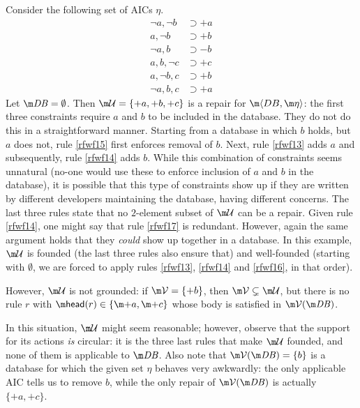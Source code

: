 \begin{example}\label{ex:founded:well-founded}
  Consider the following set of AICs $\eta$.
  \begin{align}
    \neg a,\neg b&\supset{+a} \label{rfwf13} \\
    a,\neg b&\supset{+b} \label{rfwf14} \\
    \neg a,b&\supset{-b} \label{rfwf15} \\
    a,b,\neg c&\supset{+c} \label{rfwf16} \\
    a,\neg b,c&\supset{+b} \label{rfwf17} \\
    \neg a,b,c&\supset{+a}\label{rfwf18}
  \end{align}
  Let $\db=\emptyset$.
  Then $\UU=\{{+a},{+b},{+c}\}$ is a repair for $\fulldb$: the first three constraints require ${a}$ and ${b}$ to be included in the database. 
  They do not do this in a straightforward manner. Starting from a database in which $b$ holds, but $a$ does not, rule \eqref{rfwf15} first enforces removal of $b$. 
  Next, rule \eqref{rfwf13} adds $a$ and subsequently, rule \eqref{rfwf14} adds $b$. 
  While this combination of constraints seems unnatural (no-one would use these to enforce inclusion of $a$ and $b$ in the database), it is possible that this type of constraints show up if they are written by different developers maintaining the database, having different concerns. 
  The last three rules state that no $2$-element subset of $\UU$ can be a repair. Given rule \eqref{rfwf14}, one might say that rule \eqref{rfwf17} is redundant. However, again the same argument holds that they \emph{could} show up together in a database.
  In this example, $\UU$ is founded (the last three rules also ensure that) and well-founded (starting with $\emptyset$, we are forced to apply rules \ref{rfwf13}, \ref{rfwf14} and \ref{rfwf16}, in that order).

  However, $\UU$ is not grounded: if $\VV=\{{+b}\}$, then $\VV\subsetneq\UU$, but there is no rule $r$ with $\head(r)\in\{\add a, \add c\} $ whose body is satisfied in $\VV(\db)$. %
\end{example}
In this situation, $\UU$ might seem reasonable; however, observe that the support for its actions \emph{is} circular: it is the three last rules that make $\UU$ founded, and none of them is applicable to $\db$.
Also note that $\VV(\db)=\{b\}$ is a database for which the given set $\eta$ behaves very awkwardly: the only applicable AIC tells us to remove $b$, while the only repair of $\VV(\db)$ is actually $\{{+a},{+c}\}$.

